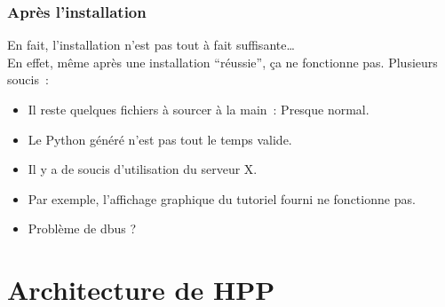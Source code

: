 \documentclass[11pt]{beamer}
\begin{document}
\begin{frame}
    \frametitle{Après l'installation}
    En fait, l'installation n'est pas tout à fait suffisante\dots\\
    En effet, même après une installation ``réussie'', ça ne fonctionne pas.
    Plusieurs soucis~:
    \begin{itemize}
        \item Il reste quelques fichiers à sourcer à la main~: Presque normal.
        \item Le Python généré n'est pas tout le temps valide.
        \item Il y a de soucis d'utilisation du serveur X.
        \item Par exemple, l'affichage graphique du  tutoriel fourni ne
            fonctionne pas.
        \item Problème de dbus ?
    \end{itemize}
\end{frame}
\section{Architecture de HPP}

\begin{frame}
    \begin{figure}
        \begin{center}
        \end{center}
    \end{figure}
\end{frame}
\end{document}
